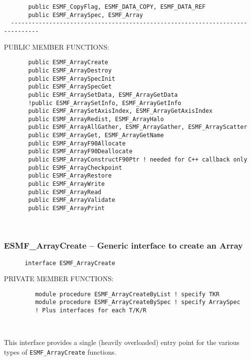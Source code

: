 \begin{verbatim}       public ESMF_CopyFlag, ESMF_DATA_COPY, ESMF_DATA_REF
       public ESMF_ArraySpec, ESMF_Array
  ------------------------------------------------------------------------------\end{verbatim}{\sf PUBLIC MEMBER FUNCTIONS:}
\begin{verbatim}       public ESMF_ArrayCreate
       public ESMF_ArrayDestroy
       public ESMF_ArraySpecInit
       public ESMF_ArraySpecGet
       public ESMF_ArraySetData, ESMF_ArrayGetData
       !public ESMF_ArraySetInfo, ESMF_ArrayGetInfo
       public ESMF_ArraySetAxisIndex, ESMF_ArrayGetAxisIndex
       public ESMF_ArrayRedist, ESMF_ArrayHalo
       public ESMF_ArrayAllGather, ESMF_ArrayGather, ESMF_ArrayScatter
       public ESMF_ArrayGet, ESMF_ArrayGetName
       public ESMF_ArrayF90Allocate
       public ESMF_ArrayF90Deallocate
       public ESMF_ArrayConstructF90Ptr ! needed for C++ callback only
       public ESMF_ArrayCheckpoint
       public ESMF_ArrayRestore
       public ESMF_ArrayWrite
       public ESMF_ArrayRead
       public ESMF_ArrayValidate
       public ESMF_ArrayPrint\end{verbatim}
 
 
\mbox{}\hrulefill\ 
 
\subsubsection [ESMF\_ArrayCreate] {ESMF\_ArrayCreate -- Generic interface to create an Array}


\begin{verbatim}      interface ESMF_ArrayCreate\end{verbatim}{\sf PRIVATE MEMBER FUNCTIONS:}
\begin{verbatim}         module procedure ESMF_ArrayCreateByList ! specify TKR
         module procedure ESMF_ArrayCreateBySpec ! specify ArraySpec
         ! Plus interfaces for each T/K/R\end{verbatim}
 
 
\mbox{}\hrulefill\ 
 

   This interface provides a single (heavily overloaded) entry point for
   the various types of {\tt ESMF\_ArrayCreate} functions.
  
